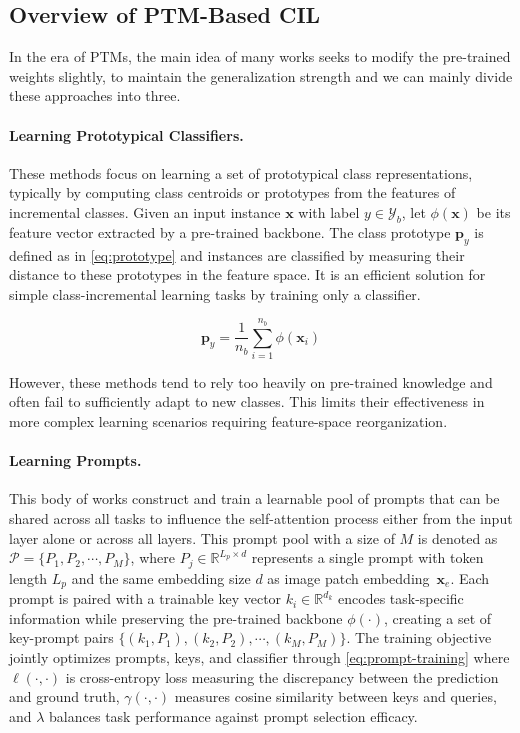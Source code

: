 \subsection{Overview of PTM-Based CIL}
In the era of PTMs, the main idea of many works seeks to modify the pre-trained weights slightly, to maintain the generalization strength and we can mainly divide these approaches into three.

\paragraph{Learning Prototypical Classifiers.}
These methods \cite{nmc, simplecil_aper} focus on learning a set of prototypical class representations, typically by computing class centroids or prototypes from the features of incremental classes.
Given an input instance $\mathbf{x}$ with label $y \in \mathcal{Y}_b$, let $\phi(\mathbf{x})$ be its feature vector extracted by a pre-trained backbone. The class prototype $\mathbf{p}_y$ is defined as in \cref{eq:prototype} and instances are classified by measuring their distance to these prototypes in the feature space.
It is an efficient solution for simple class-incremental learning tasks by training only a classifier.

\begin{equation}
\mathbf{p}_y = \frac{1}{n_b} \sum_{i=1}^{n_b} \phi(\mathbf{x}_i)
\label{eq:prototype}
\end{equation}

However, these methods tend to rely too heavily on pre-trained knowledge and often fail to sufficiently adapt to new classes. This limits their effectiveness in more complex learning scenarios requiring feature-space reorganization.

\paragraph{Learning Prompts.}
This body of works \cite{l2p, dualprompt, codaprompt} construct and train a learnable pool of prompts that can be shared across all tasks to influence the self-attention process either from the input layer alone or across all layers. 
This prompt pool with a size of $M$ is denoted as $\mathcal{P} = \{P_1, P_2, \cdots, P_M\}$, where $P_j \in \mathbb{R}^{L_p \times d}$ represents a single prompt with token length $L_p$ and the same embedding size $d$ as image patch embedding~$\mathbf{x}_e$. Each prompt is paired with a trainable key vector $k_i \in \mathbb{R}^{d_k}$ encodes task-specific information while preserving the pre-trained backbone $\phi(\cdot)$, creating a set of key-prompt pairs $\{(k_1, P_1), (k_2, P_2), \cdots, (k_M, P_M)\}$.
The training objective jointly optimizes prompts, keys, and classifier through \cref{eq:prompt-training} where $\ell(\cdot,\cdot)$ is cross-entropy loss measuring the discrepancy between the prediction and ground truth, $\gamma(\cdot,\cdot)$ measures cosine similarity between keys and queries, and $\lambda$ balances task performance against prompt selection efficacy.

